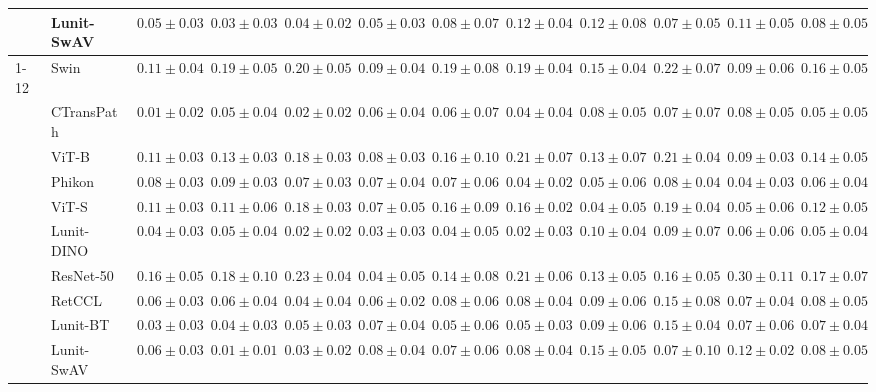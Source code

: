 \begin{tabular}{ll|cccc|c|cccc|c}
 & Lunit-SwAV & $0.05 \pm 0.03$ & $0.03 \pm 0.03$ & $0.04 \pm 0.02$ & $0.05 \pm 0.03$ & $0.08 \pm 0.07$ & $0.12 \pm 0.04$ & $0.12 \pm 0.08$ & $0.07 \pm 0.05$ & $0.11 \pm 0.05$ & $0.08 \pm 0.05$ \\
\cline{1-12}
\multirow[t]{10}{*}{Transformer} & Swin & $0.11 \pm 0.04$ & $0.19 \pm 0.05$ & $0.20 \pm 0.05$ & $0.09 \pm 0.04$ & $0.19 \pm 0.08$ & $0.19 \pm 0.04$ & $0.15 \pm 0.04$ & $0.22 \pm 0.07$ & $0.09 \pm 0.06$ & $0.16 \pm 0.05$ \\
 & CTransPath & $\mathbf{0.01 \pm 0.02}$ & $0.05 \pm 0.04$ & $\mathbf{0.02 \pm 0.02}$ & $0.06 \pm 0.04$ & $0.06 \pm 0.07$ & $0.04 \pm 0.04$ & $0.08 \pm 0.05$ & $0.07 \pm 0.07$ & $0.08 \pm 0.05$ & $0.05 \pm 0.05$ \\
 & ViT-B & $0.11 \pm 0.03$ & $0.13 \pm 0.03$ & $0.18 \pm 0.03$ & $0.08 \pm 0.03$ & $0.16 \pm 0.10$ & $0.21 \pm 0.07$ & $0.13 \pm 0.07$ & $0.21 \pm 0.04$ & $0.09 \pm 0.03$ & $0.14 \pm 0.05$ \\
 & Phikon & $0.08 \pm 0.03$ & $0.09 \pm 0.03$ & $0.07 \pm 0.03$ & $0.07 \pm 0.04$ & $0.07 \pm 0.06$ & $0.04 \pm 0.02$ & $0.05 \pm 0.06$ & $0.08 \pm 0.04$ & $\mathbf{0.04 \pm 0.03}$ & $0.06 \pm 0.04$ \\
 & ViT-S & $0.11 \pm 0.03$ & $0.11 \pm 0.06$ & $0.18 \pm 0.03$ & $0.07 \pm 0.05$ & $0.16 \pm 0.09$ & $0.16 \pm 0.02$ & $\mathbf{0.04 \pm 0.05}$ & $0.19 \pm 0.04$ & $0.05 \pm 0.06$ & $0.12 \pm 0.05$ \\
 & Lunit-DINO & $0.04 \pm 0.03$ & $0.05 \pm 0.04$ & $0.02 \pm 0.02$ & $\mathbf{0.03 \pm 0.03}$ & $\mathbf{0.04 \pm 0.05}$ & $\mathbf{0.02 \pm 0.03}$ & $0.10 \pm 0.04$ & $0.09 \pm 0.07$ & $0.06 \pm 0.06$ & $\mathbf{0.05 \pm 0.04}$ \\
 & ResNet-50 & $0.16 \pm 0.05$ & $0.18 \pm 0.10$ & $0.23 \pm 0.04$ & $0.04 \pm 0.05$ & $0.14 \pm 0.08$ & $0.21 \pm 0.06$ & $0.13 \pm 0.05$ & $0.16 \pm 0.05$ & $0.30 \pm 0.11$ & $0.17 \pm 0.07$ \\
 & RetCCL & $0.06 \pm 0.03$ & $0.06 \pm 0.04$ & $0.04 \pm 0.04$ & $0.06 \pm 0.02$ & $0.08 \pm 0.06$ & $0.08 \pm 0.04$ & $0.09 \pm 0.06$ & $0.15 \pm 0.08$ & $0.07 \pm 0.04$ & $0.08 \pm 0.05$ \\
 & Lunit-BT & $0.03 \pm 0.03$ & $0.04 \pm 0.03$ & $0.05 \pm 0.03$ & $0.07 \pm 0.04$ & $0.05 \pm 0.06$ & $0.05 \pm 0.03$ & $0.09 \pm 0.06$ & $0.15 \pm 0.04$ & $0.07 \pm 0.06$ & $0.07 \pm 0.04$ \\
 & Lunit-SwAV & $0.06 \pm 0.03$ & $\mathbf{0.01 \pm 0.01}$ & $0.03 \pm 0.02$ & $0.08 \pm 0.04$ & $0.07 \pm 0.06$ & $0.08 \pm 0.04$ & $0.15 \pm 0.05$ & $\mathbf{0.07 \pm 0.10}$ & $0.12 \pm 0.02$ & $0.08 \pm 0.05$ \\

\end{tabular}
